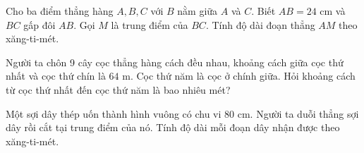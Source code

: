 \begin{ex} %
Cho ba điểm thẳng hàng $A, B, C$ với $B$ nằm giữa $A$ và $C$. Biết $AB = 24\text{ cm}$ và $BC$ gấp đôi $AB$. Gọi $M$ là trung điểm của $BC$. Tính độ dài đoạn thẳng $AM$ theo xăng-ti-mét.
\end{ex}

\begin{ex} %
Người ta chôn 9 cây cọc thẳng hàng cách đều nhau, khoảng cách giữa cọc thứ nhất và cọc thứ chín là $64\text{ m}$. Cọc thứ năm là cọc ở chính giữa. Hỏi khoảng cách từ cọc thứ nhất đến cọc thứ năm là bao nhiêu mét?
\end{ex}

\begin{ex} %
Một sợi dây thép uốn thành hình vuông có chu vi $80\text{ cm}$. Người ta duỗi thẳng sợi dây rồi cắt tại trung điểm của nó. Tính độ dài mỗi đoạn dây nhận được theo xăng-ti-mét.
\end{ex}
